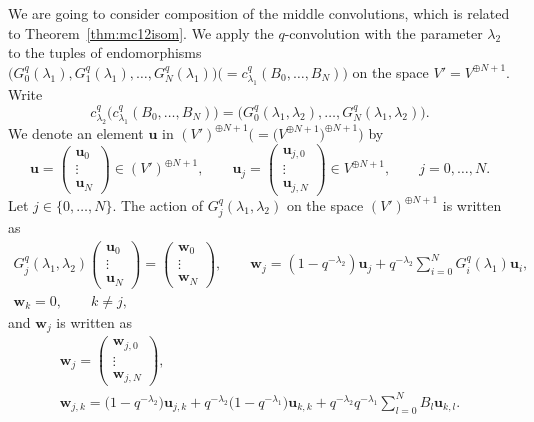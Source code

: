 \documentclass[pdftex]{sigma}
\numberwithin{equation}{section}
\theoremstyle{definition}
\begin{document}
We are going to consider composition of the middle convolutions, which is related to Theorem~\ref{thm:mc12isom}.
We apply the $q$-convolution with the parameter $\lambda _2 $ to the tuples of endomorphisms ${ \bigl( G_0^{q} (\lambda _1) , G_1^{q} (\lambda _1) ,\dots , G_N^{q} (\lambda _1 )\bigr) \bigl(= c _{\lambda _1}^q(B_0, \dots ,B_N)\bigr)}$ on the space $V' =V^{\oplus N+1}$.
Write
\begin{equation*}
c _{\lambda _2}^q\bigl(c _{\lambda _1}^q(B_0, \dots ,B_N)\bigr) = \bigl( G_0^{q} (\lambda _1, \lambda _2 ) , \dots , G_N^{q} (\lambda _1, \lambda _2 ) \bigr).
\end{equation*}
We denote an element $\mathbf{u} $ in $ (V') ^{\oplus N+1} \bigl(= \bigl(V^{\oplus N+1}\bigr) ^{\oplus N+1}\bigr)$ by
\begin{equation*}
 \mathbf{u} = \begin{pmatrix} \mathbf{u}_{0} \\ \vdots \\ \mathbf{u}_{N} \end{pmatrix} \in (V') ^{\oplus N+1} , \qquad \mathbf{u}_{j} = \begin{pmatrix} \mathbf{u}_{j,0} \\ \vdots \\ \mathbf{u}_{j,N} \end{pmatrix} \in V ^{\oplus N+1}, \qquad j=0,\dots , N.
\end{equation*}
Let $j \in \{ 0,\dots ,N \}$.
The action of $G_j^{q} (\lambda _1, \lambda _2 ) $ on the space $(V') ^{\oplus N+1} $ is written as
\begin{gather*}
G_j^{q} (\lambda _1, \lambda _2 ) \begin{pmatrix} \mathbf{u}_{0} \\ \vdots \\ \mathbf{u}_{N} \end{pmatrix} =\begin{pmatrix} \mathbf{w}_{0} \\ \vdots \\ \mathbf{w}_{N} \end{pmatrix}, \qquad \mathbf{w}_j =(1- q^{-\lambda _2} ) \mathbf{u}_j + q^{-\lambda _2} \sum _{i=0}^{N} G_i^{q} (\lambda _1) \mathbf{u}_i , \\ \mathbf{w}_k =0 , \qquad k\neq j,
\end{gather*}
and $\mathbf{w}_j $ is written as
\begin{gather}
\mathbf{w}_{j} = \begin{pmatrix} \mathbf{w}_{j,0} \\ \vdots \\ \mathbf{w}_{j,N} \end{pmatrix} ,\nonumber\\ \mathbf{w}_{j,k} = \bigl(1- q^{-\lambda _2} \bigr) \mathbf{u}_{j,k} + q^{-\lambda _2} \bigl(1- q^{-\lambda _1} \bigr) \mathbf{u}_{k,k} + q^{-\lambda _2} q^{-\lambda _1} \sum _{l=0}^{N} B_{l} \mathbf{u}_{k,l} \label{eq:wjq}
.
\end{gather}
\end{document}
